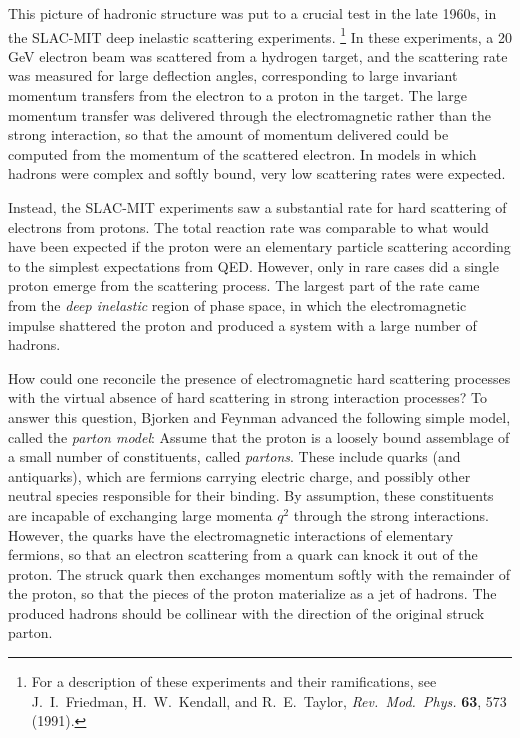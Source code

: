 This picture of hadronic structure was put to a crucial test in the late
1960s, in the SLAC-MIT deep inelastic scattering experiments.%
\footnote{For a description of these experiments and their ramifications, see
J.~I.~Friedman, H.~W.~Kendall, and R.~E.~Taylor, \emph{Rev.\ Mod.\ Phys.}
\textbf{63}, 573 (1991).}  In these experiments, a 20 GeV electron beam was
scattered from a hydrogen target, and the scattering rate was measured for
large deflection angles, corresponding to large invariant momentum transfers
from the electron to a proton in the target.  The large momentum transfer was
delivered through the electromagnetic rather than the strong interaction, so
that the amount of momentum delivered could be computed from the momentum of
the scattered electron.  In models in which hadrons were complex and softly
bound, very low scattering rates were expected.

Instead, the SLAC-MIT experiments saw a substantial rate for hard scattering
of electrons from protons.  The total reaction rate was comparable to what
would have been expected if the proton were an elementary particle scattering
according to the simplest expectations from QED.  However, only in rare cases
did a single proton emerge from the scattering process.  The largest part of
the rate came from the \emph{deep inelastic} region of phase space, in which
the electromagnetic impulse shattered the proton and produced a system with
a large number of hadrons.

How could one reconcile the presence of electromagnetic hard scattering
processes with the virtual absence of hard scattering in strong interaction
processes?  To answer this question, Bjorken and Feynman advanced the
following simple model, called the \emph{parton model}: Assume that the
proton is a loosely bound assemblage of a small number of constituents,
called \emph{partons}.  These include quarks (and antiquarks), which are
fermions carrying electric charge, and possibly other neutral species
responsible for their binding.  By assumption, these constituents are
incapable of exchanging large momenta $q^2$ through the strong interactions.
However, the quarks have the electromagnetic interactions of elementary
fermions, so that an electron scattering from a quark can knock it out of
the proton.  The struck quark then exchanges momentum softly with the
remainder of the proton, so that the pieces of the proton materialize as a
jet of hadrons.  The produced hadrons should be collinear with the direction
of the original struck parton.

